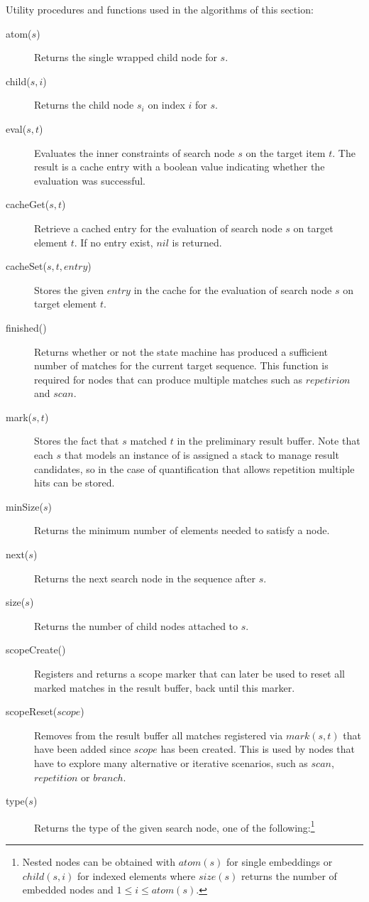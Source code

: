 \documentclass[11pt,a4paper]{report}
\begin{document}
Utility procedures and functions used in the algorithms of this section:
\begin{description}
	\item[atom($s$)] Returns the single wrapped child node for $s$. 
	\item[child($s, i$)] Returns the child node $s_i$ on index $i$ for $s$. 
	\item[eval($s,t$)] Evaluates the inner constraints of search node $s$ on the target item $t$. The result is a cache entry with a boolean value indicating whether the evaluation was successful.
	\item[cacheGet($s,t$)] Retrieve a cached entry for the evaluation of search node $s$ on target element $t$. If no entry exist, $nil$ is returned.
	\item[cacheSet($s, t, entry$)] Stores the given $entry$ in the cache for the evaluation of search node $s$ on target element $t$.  
	\item[finished()] Returns whether or not the state machine has produced a sufficient number of matches for the current target sequence. This function is required for nodes that can produce multiple matches such as $repetirion$ and $scan$.
	\item[mark($s,t$)] Stores the fact that $s$ matched $t$ in the preliminary result buffer. Note that each $s$ that models an instance of  is assigned a stack to manage result candidates, so in the case of quantification that allows repetition multiple hits can be stored.
	\item[minSize($s$)] Returns the minimum number of elements needed to satisfy a node.
	\item[next($s$)] Returns the next search node in the sequence after $s$.
	\item[size($s$)] Returns the number of child nodes attached to $s$.
	\item[scopeCreate()] Registers and returns a scope marker that can later be used to reset all marked matches in the result buffer, back until this marker.
	\item[scopeReset($scope$)] Removes from the result buffer all matches registered via $mark(s,t)$ that have been added since $scope$ has been created. This is used by nodes that have to explore many alternative or iterative scenarios, such as $scan$, $repetition$ or $branch$.
	\item[type($s$)] Returns the type of the given search node, one of the following:\footnote{Nested nodes can be obtained with $atom(s)$ for single embeddings or $child(s,i)$ for indexed elements where $size(s)$ returns the number of embedded nodes and $1 \leq i \leq atom(s)$.}

\end{description}
\end{document}

